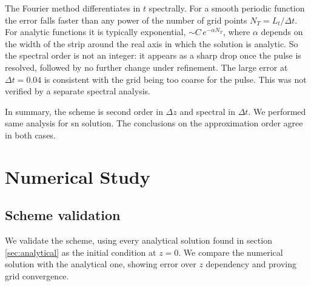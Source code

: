 \documentclass{article}
\begin{document}
                The Fourier method differentiates in \(t\) spectrally. For a smooth periodic function the error falls faster than any power of the number of grid points \(N_T = L_t/\Delta t\). For analytic functions it is typically exponential, \(\sim C\,e^{-\alpha N_T}\), where \(\alpha\) depends on the width of the strip around the real axis in which the solution is analytic. So the spectral order is not an integer: it appears as a sharp drop once the pulse is resolved, followed by no further change under refinement. The large error at \(\Delta t = 0.04\) is consistent with the grid being too coarse for the pulse. This was not verified by a separate spectral analysis.

                In summary, the scheme is second order in \(\Delta z\) and spectral in \(\Delta t\). We performed same analysis for sn solution. The conclusions on the approximation order agree in both cases.
    \section{Numerical Study}

        \subsection{Scheme validation}
            We validate the scheme, using every analytical solution found in section \ref{sec:analytical} as the initial condition at \(z=0\). We compare the numerical solution with the analytical one, showing error over \(z\) dependency and proving grid convergence.
\end{document}
